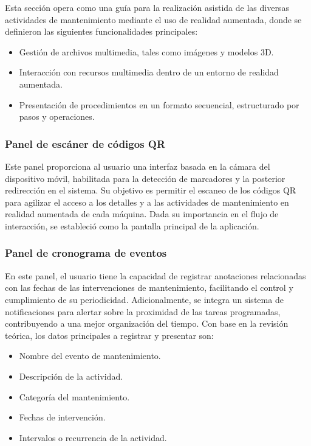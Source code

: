             Esta sección opera como una guía para la realización asistida de las diversas actividades de mantenimiento mediante el uso de realidad aumentada, donde se definieron las siguientes funcionalidades principales:

            \begin{itemize}
                \item Gestión de archivos multimedia, tales como imágenes y modelos 3D.
                \item Interacción con recursos multimedia dentro de un entorno de realidad aumentada.
                \item Presentación de procedimientos en un formato secuencial, estructurado por pasos y operaciones.
            \end{itemize}

        \subsubsection{Panel de escáner de códigos QR}

            Este panel proporciona al usuario una interfaz basada en la cámara del dispositivo móvil, habilitada para la detección de marcadores y la posterior redirección en el sistema. Su objetivo es permitir el escaneo de los códigos QR para agilizar el acceso a los detalles y a las actividades de mantenimiento en realidad aumentada de cada máquina. Dada su importancia en el flujo de interacción, se estableció como la pantalla principal de la aplicación.

        \subsubsection{Panel de cronograma de eventos}

            En este panel, el usuario tiene la capacidad de registrar anotaciones relacionadas con las fechas de las intervenciones de mantenimiento, facilitando el control y cumplimiento de su periodicidad. Adicionalmente, se integra un sistema de notificaciones para alertar sobre la proximidad de las tareas programadas, contribuyendo a una mejor organización del tiempo. Con base en la revisión teórica, los datos principales a registrar y presentar son:

            \begin{itemize}
                \item Nombre del evento de mantenimiento.
                \item Descripción de la actividad.
                \item Categoría del mantenimiento.
                \item Fechas de intervención.
                \item Intervalos o recurrencia de la actividad.
            \end{itemize}


